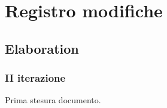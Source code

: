 \documentclass[10pt]{softeng} %
\begin{document}
\startofdocument{}









\clearpage

\section{Registro modifiche}

\subsection{Elaboration}

\subsubsection{II iterazione}

Prima stesura documento.


\printcustombib{}

\end{document}
